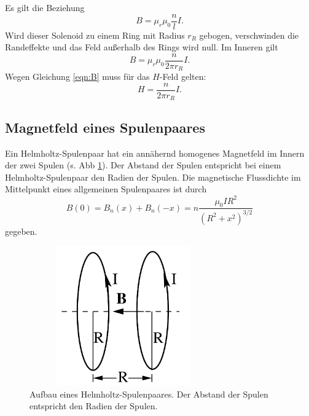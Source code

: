 Es gilt die Beziehung
\begin{equation}
    B = \mu_{r} \mu_{0} \frac{n}{l} I.
    \label{eqn:langespule}
\end{equation}
Wird dieser Solenoid zu einem Ring mit Radius $r_{R}$ gebogen, verschwinden die 
Randeffekte und das Feld außerhalb des Rings wird null. 
Im Inneren gilt
\begin{equation}
    B = \mu_{r} \mu_{0} \frac{n}{2\pi r_{R}} I.
    \label{eqn:ring}
\end{equation}
Wegen Gleichung \eqref{eqn:B} muss für das $H$-Feld gelten:
\begin{equation}
    H = \frac{n}{2\pi r_{R}} I.
    \label{eqn:H}
\end{equation}

\subsection{Magnetfeld eines Spulenpaares}
Ein Helmholtz-Spulenpaar hat ein annähernd homogenes Magnetfeld im Innern der zwei Spulen %
(s. Abb \ref{fig:helmholtz}). Der Abstand der Spulen entspricht bei einem Helmholtz-Spulenpaar den Radien der
Spulen.
Die magnetische Flussdichte im Mittelpunkt eines allgemeinen Spulenpaares ist durch 
\begin{equation}
    B(0)= B_{n}(x) + B_{n}(-x) = n \frac{\mu_{0} I R^2}{(R^2 + x^2)^{3/2}} %
    \label{eqn:spulenpaar}
\end{equation}
gegeben.
\begin{figure}
    \centering
    \includegraphics[width=8cm,height=6cm]{build/Helmholtz.png}%
    \caption{Aufbau eines Helmholtz-Spulenpaares. Der Abstand der Spulen
    entspricht den Radien der Spulen.}
    \label{fig:helmholtz}
\end{figure}

